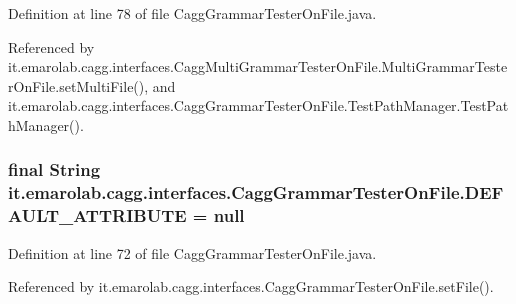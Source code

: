Definition at line 78 of file Cagg\-Grammar\-Tester\-On\-File.\-java.



Referenced by it.\-emarolab.\-cagg.\-interfaces.\-Cagg\-Multi\-Grammar\-Tester\-On\-File.\-Multi\-Grammar\-Tester\-On\-File.\-set\-Multi\-File(), and it.\-emarolab.\-cagg.\-interfaces.\-Cagg\-Grammar\-Tester\-On\-File.\-Test\-Path\-Manager.\-Test\-Path\-Manager().

\hypertarget{classit_1_1emarolab_1_1cagg_1_1interfaces_1_1CaggGrammarTesterOnFile_a41558776eba9084504efe205570d86ba}{
\subsubsection[{D\-E\-F\-A\-U\-L\-T\-\_\-\-A\-T\-T\-R\-I\-B\-U\-T\-E}]{\setlength{\rightskip}{0pt plus 5cm}final String it.\-emarolab.\-cagg.\-interfaces.\-Cagg\-Grammar\-Tester\-On\-File.\-D\-E\-F\-A\-U\-L\-T\-\_\-\-A\-T\-T\-R\-I\-B\-U\-T\-E = null\hspace{0.3cm}{\ttfamily [static]}}}\label{classit_1_1emarolab_1_1cagg_1_1interfaces_1_1CaggGrammarTesterOnFile_a41558776eba9084504efe205570d86ba}


Definition at line 72 of file Cagg\-Grammar\-Tester\-On\-File.\-java.



Referenced by it.\-emarolab.\-cagg.\-interfaces.\-Cagg\-Grammar\-Tester\-On\-File.\-set\-File().

